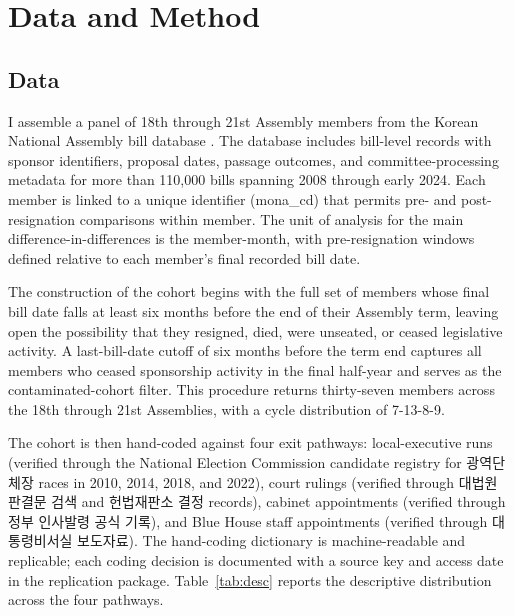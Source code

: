 \documentclass[11pt]{article}
\begin{document}
\section{Data and Method}

\subsection{Data}

I assemble a panel of 18th through 21st Assembly members from the Korean National Assembly bill database \citep{kna2024}. The database includes bill-level records with sponsor identifiers, proposal dates, passage outcomes, and committee-processing metadata for more than 110,000 bills spanning 2008 through early 2024. Each member is linked to a unique identifier (mona\_cd) that permits pre- and post-resignation comparisons within member. The unit of analysis for the main difference-in-differences is the member-month, with pre-resignation windows defined relative to each member's final recorded bill date.

The construction of the cohort begins with the full set of members whose final bill date falls at least six months before the end of their Assembly term, leaving open the possibility that they resigned, died, were unseated, or ceased legislative activity. A last-bill-date cutoff of six months before the term end captures all members who ceased sponsorship activity in the final half-year and serves as the contaminated-cohort filter. This procedure returns thirty-seven members across the 18th through 21st Assemblies, with a cycle distribution of 7-13-8-9.

The cohort is then hand-coded against four exit pathways: local-executive runs (verified through the National Election Commission candidate registry for 광역단체장 races in 2010, 2014, 2018, and 2022), court rulings (verified through 대법원 판결문 검색 and 헌법재판소 결정 records), cabinet appointments (verified through 정부 인사발령 공식 기록), and Blue House staff appointments (verified through 대통령비서실 보도자료). The hand-coding dictionary is machine-readable and replicable; each coding decision is documented with a source key and access date in the replication package. Table~\ref{tab:desc} reports the descriptive distribution across the four pathways.
\end{document}
